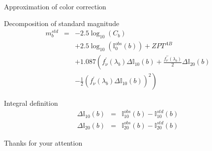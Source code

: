 \documentclass{beamer}
\begin{document}
\begin{frame}{Approximation of color correction}
\begin{alertblock}{Decomposition of standard magnitude}
\begin{eqnarray}
m_b^{std} & = & -2.5 \log_{10}(C_b)  \nonumber \\
          &   &  + 2.5 \log_{10}(\mathbb{I}_0^{obs}(b)) + ZPT^{AB}  \nonumber \\
          &   &  + 1.087\left( f_\nu^\prime(\lambda_b) \Delta \mathbb{I}_{10}(b) +
          \frac{f_\nu^{\prime\prime}(\lambda_b)}{2}\Delta \mathbb{I}_{20}(b) \right. \nonumber \\
         & & - \left. \frac{1}{2}\left( f_\nu^\prime(\lambda_b) \Delta \mathbb{I}_{10}(b) \right)^2             
          \right)
\end{eqnarray}
\end{alertblock}
\begin{block}{Integral definition}
\begin{eqnarray}
\Delta \mathbb{I}_{10}(b) & = &  \mathbb{I}_{10}^{obs}(b)  -  \mathbb{I}_{10}^{std}(b) \\
\Delta \mathbb{I}_{20}(b) & = &   \mathbb{I}_{20}^{obs}(b)  -  \mathbb{I}_{20}^{std}(b) 
\end{eqnarray}
\end{block}
\end{frame}


\begin{frame}
\begin{center}
{

\LARGE \alert{Thanks for your attention}}

\end{center}

\end{frame}


 
\end{document}
